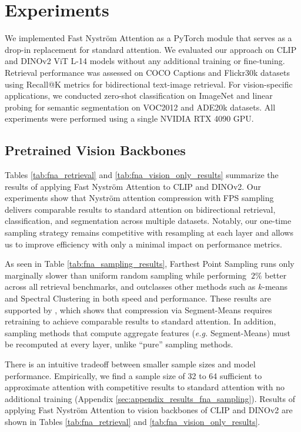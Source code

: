 \documentclass[10pt,twocolumn,letterpaper]{article}
\begin{document}
\section{Experiments}

We implemented Fast Nystr\"om Attention as a PyTorch module that serves as a drop-in replacement for standard attention. We evaluated our approach on CLIP \cite{ilharco2021openclip} \cite{radford2021clip} and DINOv2 \cite{oquab2023dinov2} ViT L-14 models without any additional training or fine-tuning. Retrieval performance was assessed on COCO Captions \cite{chen2015coco} and Flickr30k \cite{young2014flickr} datasets using Recall@K metrics for bidirectional text-image retrieval. For vision-specific applications, we conducted zero-shot classification on ImageNet \cite{deng2009imagenet} and linear probing for semantic segmentation on VOC2012 \cite{pascal-voc-2012} and ADE20k \cite{zhou2017ade} datasets. All experiments were performed using a single NVIDIA RTX 4090 GPU.


\subsection{Pretrained Vision Backbones}




Tables \ref{tab:fna_retrieval} and \ref{tab:fna_vision_only_results} summarize the results of applying Fast Nystr\"om Attention to CLIP and DINOv2. Our experiments show that Nystr\"om attention compression with FPS sampling delivers comparable results to standard attention on bidirectional retrieval, classification, and segmentation across multiple datasets. Notably, our one-time sampling strategy remains competitive with resampling at each layer and allows us to improve efficiency with only a minimal impact on performance metrics.

As seen in Table \ref{tab:fna_sampling_results}, Farthest Point Sampling runs only marginally slower than uniform random sampling while performing $~2\%$ better across all retrieval benchmarks, and outclasses other methods such as $k$-means and Spectral Clustering in both speed and performance. These results are supported by \cite{xiong2021nystromformer}, which shows that compression via Segment-Means requires retraining to achieve comparable results to standard attention. In addition, sampling methods that compute aggregate features (\textit{e.g.} Segment-Means) must be recomputed at every layer, unlike ``pure'' sampling methods.

There is an intuitive tradeoff between smaller sample sizes and model performance. Empirically, we find a sample size of 32 to 64 sufficient to approximate attention with competitive results to standard attention with no additional training (Appendix \ref{sec:appendix_results_fna_sampling}). Results of applying Fast Nystr\"om Attention to vision backbones of CLIP and DINOv2 are shown in Tables \ref{tab:fna_retrieval} and \ref{tab:fna_vision_only_results}. 
\end{document}

